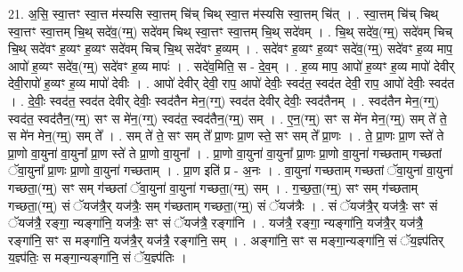 \documentclass[17pt]{extarticle}
\begin{document}
21. अ॒सि॒ स्वा॒त्तꣳ स्वा॒त्त म॑स्यसि स्वा॒त्तम् चि॑च् चिथ् स्वा॒त्त म॑स्यसि स्वा॒त्तम् चि॑त् । . स्वा॒त्तम् चि॑च् चिथ् स्वा॒त्तꣳ स्वा॒त्तम् चि॒थ् सदे॑व॒(ग्म्॒) सदे॑वम् चिथ् स्वा॒त्तꣳ स्वा॒त्तम् चि॒थ् सदे॑वम् । . चि॒थ् सदे॑व॒(ग्म्॒) सदे॑वम् चिच् चि॒थ् सदे॑वꣳ ह॒व्यꣳ ह॒व्यꣳ सदे॑वम् चिच् चि॒थ् सदे॑वꣳ ह॒व्यम् । . सदे॑वꣳ ह॒व्यꣳ ह॒व्यꣳ सदे॑व॒(ग्म्॒) सदे॑वꣳ ह॒व्य माप॒ आपो॑ ह॒व्यꣳ सदे॑व॒(ग्म्॒) सदे॑वꣳ ह॒व्य मापः॑ । . सदे॑व॒मिति॒ स - दे॒व॒म् । . ह॒व्य माप॒ आपो॑ ह॒व्यꣳ ह॒व्य मापो॑ देवीर् देवी॒रापो॑ ह॒व्यꣳ ह॒व्य मापो॑ देवीः । . आपो॑ देवीर् देवी॒ राप॒ आपो॑ देवीः॒ स्वद॑त॒ स्वद॑त देवी॒ राप॒ आपो॑ देवीः॒ स्वद॑त । . दे॒वीः॒ स्वद॑त॒ स्वद॑त देवीर् देवीः॒ स्वद॑तैन मेन॒(ग्ग्॒) स्वद॑त देवीर् देवीः॒ स्वद॑तैनम् । . स्वद॑तैन मेन॒(ग्ग्॒) स्वद॑त॒ स्वद॑तैन॒(ग्म्॒) सꣳ स मे॑न॒(ग्ग्॒) स्वद॑त॒ स्वद॑तैन॒(ग्म्॒) सम् । . ए॒न॒(ग्म्॒) सꣳ स मे॑न मेन॒(ग्म्॒) सम् ते॑ ते॒ स मे॑न मेन॒(ग्म्॒) सम् ते᳚ । . सम् ते॑ ते॒ सꣳ सम् ते᳚ प्रा॒णः प्रा॒ण स्ते॒ सꣳ सम् ते᳚ प्रा॒णः । . ते॒ प्रा॒णः प्रा॒ण स्ते॑ ते प्रा॒णो वा॒युना॑ वा॒युना᳚ प्रा॒ण स्ते॑ ते प्रा॒णो वा॒युना᳚ । . प्रा॒णो वा॒युना॑ वा॒युना᳚ प्रा॒णः प्रा॒णो वा॒युना॑ गच्छताम् गच्छतां ॅवा॒युना᳚ प्रा॒णः प्रा॒णो वा॒युना॑ गच्छताम् । . प्रा॒ण इति॑ प्र - अ॒नः । . वा॒युना॑ गच्छताम् गच्छतां ॅवा॒युना॑ वा॒युना॑ गच्छता॒(ग्म्॒) सꣳ सम् ग॑च्छतां ॅवा॒युना॑ वा॒युना॑ गच्छता॒(ग्म्॒) सम् । . ग॒च्छ॒ता॒(ग्म्॒) सꣳ सम् ग॑च्छताम् गच्छता॒(ग्म्॒) सं ॅयज॑त्रै॒र् यज॑त्रैः॒ सम् ग॑च्छताम् गच्छता॒(ग्म्॒) सं ॅयज॑त्रैः । . सं ॅयज॑त्रै॒र् यज॑त्रैः॒ सꣳ सं ॅयज॑त्रै॒ रङ्गा॒ न्यङ्गा॑नि॒ यज॑त्रैः॒ सꣳ सं ॅयज॑त्रै॒ रङ्गा॑नि । . यज॑त्रै॒ रङ्गा॒ न्यङ्गा॑नि॒ यज॑त्रै॒र् यज॑त्रै॒ रङ्गा॑नि॒ सꣳ स मङ्गा॑नि॒ यज॑त्रै॒र् यज॑त्रै॒ रङ्गा॑नि॒ सम् । . अङ्गा॑नि॒ सꣳ स मङ्गा॒न्यङ्गा॑नि॒ सं ॅय॒ज्ञ्प॑तिर् य॒ज्ञ्प॑तिः॒ स मङ्गा॒न्यङ्गा॑नि॒ सं ॅय॒ज्ञ्प॑तिः । \newline
\end{document}
